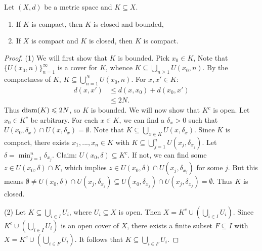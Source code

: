    \begin{proposition}\label{prop:compact-subsets}
        Let $(X,d)$ be a metric space and $K \subseteq X$.
            \begin{enumerate}[label = (\arabic*),itemsep=1pt,topsep=3pt]
                \item If $K$ is compact, then $K$ is closed and bounded,
                \item If $X$ is compact and $K$ is closed, then $K$ is compact.
            \end{enumerate}
    \end{proposition}
        \begin{proof}
            (1) We will first show that $K$ is bounded. Pick $x_0 \in K$, Note that $\{U(x_0,n)\}_{n = 1}^\infty$ is a cover for $K$, whence $K \subseteq \bigcup_{n \geq 1}U(x_0,n)$. By the compactness of $K$, $K \subseteq \bigcup_{n = 1}^N U(x_0,n)$. For $x,x' \in K$:
                \begin{equation*}
                \begin{split}
                    d(x,x')
                    & \leq d(x,x_0) + d(x_0,x') \\
                    & \leq 2N.
                \end{split}
                \end{equation*}
            Thus $\operatorname{diam}(K) \leqslant 2N$, so $K$ is bounded. We will now show that $K^c$ is open. Let $x_0 \in K^c$ be arbitrary. For each $x \in K$, we can find a $\delta_x > 0$ such that $U(x_0,\delta_x) \cap U(x,\delta_x) = \emptyset$. Note that $K \subseteq \bigcup_{x \in K}U(x,\delta_x)$. Since $K$ is compact, there exists $x_1,...,x_n \in K$ with $K \subseteq \bigcup_{j = 1}^n U(x_j,\delta_{x_j})$. Let $\delta = \min_{j = 1}^n \delta_{x_j}$. Claim: $U(x_0,\delta) \subseteq K^c$. If not, we can find some $z \in U(x_0,\delta) \cap K$, which implies $z \in U(x_0,\delta) \cap U(x_j,\delta_{x_j})$ for some $j$. But this means $\emptyset \neq U(x_0,\delta) \cap U(x_j,\delta_{x_j}) \subseteq U(x_0,\delta_{x_j}) \cap U(x_j,\delta_{x_j}) = \emptyset$. Thus $K$ is closed.

            (2) Let $K \subseteq \bigcup_{i \in I}U_i$, where $U_i \subseteq X$ is open. Then $X = K^c \cup \left( \bigcup_{i \in I}U_i \right)$. Since $K^c \cup \left( \bigcup_{i \in I}U_i \right)$ is an open cover of $X$, there exists a finite subset $F \subseteq I$ with $X = K^c \cup \left( \bigcup_{i \in F}U_i \right)$. It follows that $K \subseteq \bigcup_{i \in F}U_i$.
        \end{proof}
    
